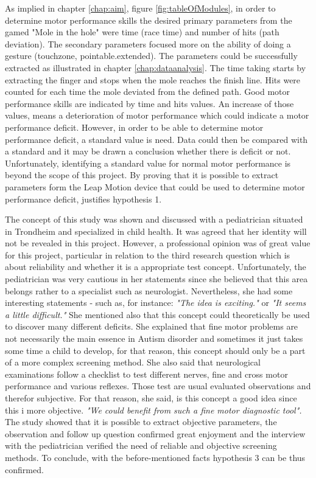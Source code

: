 As implied in chapter \ref{chap:aim}, figure \ref{fig:tableOfModules}, in order to determine motor performance skills
the desired primary parameters from the gamed "Mole in the hole" were time (race time) and number of hits (path deviation). The secondary parameters focused more on the ability of doing a gesture (touchzone, pointable.extended). The parameters could be successfully extracted as illustrated in chapter \ref{chap:dataanalysis}. The time taking starts by extracting the finger and stops when the mole reaches the finish line. Hits were counted for each time the mole deviated from the defined path. Good motor performance skills are indicated by time and hits values. An increase of those values, means a deterioration of motor performance which could indicate a motor performance deficit. However, in order to be able to determine motor performance deficit, a standard value is need. Data could then be compared with a standard and it may be drawn a conclusion whether there is deficit or not. Unfortunately, identifying a standard value for normal motor performance is beyond the scope of this project. 
By proving that it is possible to extract parameters form the Leap Motion device that could be used to determine motor performance deficit, justifies hypothesis 1. 

The concept of this study was shown and discussed with a pediatrician situated in Trondheim and specialized in child health. It was agreed that her identity will not be revealed in this project. However, a professional opinion was of great value for this project, particular in relation to the third research question which is about reliability and whether it is a appropriate test concept. Unfortunately, the pediatrician was very cautious in her statements since she believed that this area belongs rather to a specialist such as neurologist. Nevertheless, she had some interesting statements - such as, for instance: \textit{"The idea is exciting."} or \textit{"It seems a little difficult."} She mentioned also that this concept could theoretically be used to discover many different deficits. She explained that fine motor problems are not necessarily the main essence in Autism disorder and sometimes it just takes some time a child to develop, for that reason, this concept should only be a part of a more complex screening method. She also said that neurological examinations follow a checklist to test different nerves, fine and cross motor performance and various reflexes. Those test are usual evaluated observations and therefor subjective. For that reason, she said, is this concept a good idea since this i more objective. \textit{"We could benefit from such a fine motor diagnostic tool".} 
The study showed that it is possible to extract objective parameters, the observation and follow up question confirmed great enjoyment and the interview with the pediatrician verified the need of reliable and objective screening methods. To conclude, with the before-mentioned facts hypothesis 3 can be thus confirmed. 

